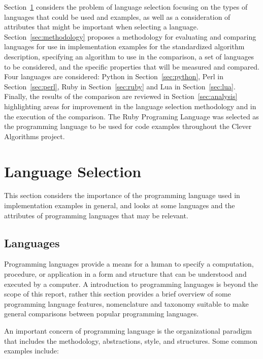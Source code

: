 \documentclass[a4paper, 11pt]{article}
\begin{document}
Section~\ref{sec:language_selection} considers the problem of language selection focusing on the types of languages that could be used and examples, as well as a consideration of attributes that might be important when selecting a language.
Section~\ref{sec:methodology} proposes a methodology for evaluating and comparing languages for use in implementation examples for the standardized algorithm description, specifying an algorithm to use in the comparison, a set of languages to be considered, and the specific properties that will be measured and compared.
Four languages are considered: Python in Section~\ref{sec:python}, Perl in Section~\ref{sec:perl}, Ruby in Section~\ref{sec:ruby} and Lua in Section~\ref{sec:lua}.
Finally, the results of the comparison are reviewed in Section~\ref{sec:analysis} highlighting areas for improvement in the language selection methodology and in the execution of the comparison. The Ruby Programing Language was selected as the programming language to be used for code examples throughout the Clever Algorithms project.

% 
% 
\section{Language Selection}
\label{sec:language_selection}
This section considers the importance of the programming language used in implementation examples in general, and looks at some languages and the attributes of programming languages that may be relevant.

% 
%
\subsection{Languages}
Programming languages provide a means for a human to specify a computation, procedure, or application in a form and structure that can be understood and executed by a computer.
A introduction to programming languages is beyond the scope of this report, rather this section provides a brief overview of some programming language features, nomenclature and taxonomy suitable to make general comparisons between popular programming languages.

An important concern of programming language is the organizational paradigm that includes the methodology, abstractions, style, and structures. Some common examples include:
\end{document}
